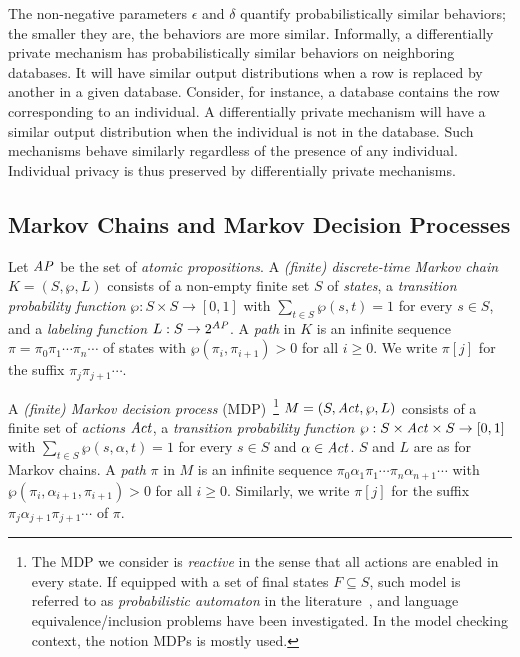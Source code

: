 The non-negative parameters $\epsilon$ and $\delta$ quantify
probabilistically similar behaviors;
the smaller they are, the behaviors are more similar.
Informally, a differentially private mechanism has probabilistically
similar behaviors on neighboring databases. It will have similar
output distributions when a row is replaced by another in a given
database. Consider, for instance, a database contains the row
corresponding to an individual. A differentially private mechanism
will have a similar output distribution when the individual is not in
the database. Such mechanisms behave similarly regardless of the
presence of any individual. Individual privacy is thus
preserved by differentially private mechanisms.

\subsection{Markov Chains and Markov Decision Processes}

Let $\mathit{AP}$ be the set of \emph{atomic propositions}.
A \emph{(finite) discrete-time Markov chain} $K = (S, \wp, L)$ consists
of a non-empty finite set $S$ of \emph{states}, a \emph{transition
  probability function} $\wp : S \times S \rightarrow [0, 1]$ with
$\sum_{t \in S} \wp(s, t) = 1$ for every $s \in S$, and
a \emph{labeling function} $L : S \rightarrow 2^{\mathit{AP}}$. A \emph{path}
in $K$ is an infinite sequence $\pi = \pi_0 \pi_1 \cdots \pi_n \cdots$
of states with $\wp (\pi_i, \pi_{i+1}) > 0$ for all $i \geq 0$. We write
$\pi[j]$ for the suffix $\pi_j \pi_{j+1} \cdots$. %

A \emph{(finite) Markov decision process}
(MDP)~\footnote{The MDP we consider is \emph{reactive} in the sense that
all actions are enabled in every state. If equipped with a set of final states $F\subseteq S$, such model is
referred to as \emph{probabilistic automaton} in the literature~\cite{Rabin63}, and language equivalence/inclusion
problems have been investigated. In the model checking context, the notion MDPs is mostly used.}
 $M = (S, \mathit{Act}, \wp, L)$ consists
of
a finite set of \emph{actions} $\mathit{Act}$,
a \emph{transition probability function} $\wp : S \times \mathit{Act}
\times S \rightarrow [0, 1]$ with $\sum_{t \in S} \wp(s, \alpha, t)
= 1$ for every $s \in S$ and $\alpha \in \mathit{Act}$. $S$ and
$L$ are as for Markov chains.
A \emph{path} $\pi$ in $M$ is an infinite sequence $\pi_0 \alpha_1
\pi_1 \cdots \pi_n \alpha_{n+1} \cdots$ with
$\wp(\pi_i, \alpha_{i+1}, \pi_{i+1}) > 0$ for all $i \geq 0$.
Similarly, we write $\pi[j]$ for the suffix $\pi_j \alpha_{j+1}
\pi_{j+1} \cdots$ of $\pi$.


